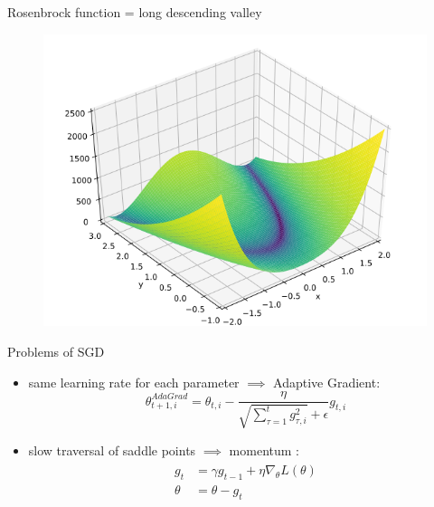 \documentclass{beamer}
\begin{document}
\begin{frame}{Rosenbrock function = long descending valley}

\begin{figure}[h]
\includegraphics[scale=0.50]{img/rosenbrock_function}
\end{figure}

\end{frame}
\begin{frame}{Problems of SGD}

\begin{itemize}
\item same learning rate for each parameter $\implies$ Adaptive Gradient:
\begin{equation}\label{eq:adagrad_update}
\theta_{t+1,i}^{AdaGrad} = \theta_{t,i} - \frac{\eta}{\sqrt{ \sum_{\tau=1}^t{g_{\tau,i}^2}} + \epsilon} g_{t,i}
\end{equation}

\item slow traversal of saddle points $\implies$ momentum \cite{cit:ruder}:
\begin{align}
\begin{split}
g_t &= \gamma g_{t-1} + \eta \nabla_\theta L( \theta) \\  
\theta &= \theta - g_t
\end{split}
\end{align}

\end{itemize}

\end{frame}
\end{document}
